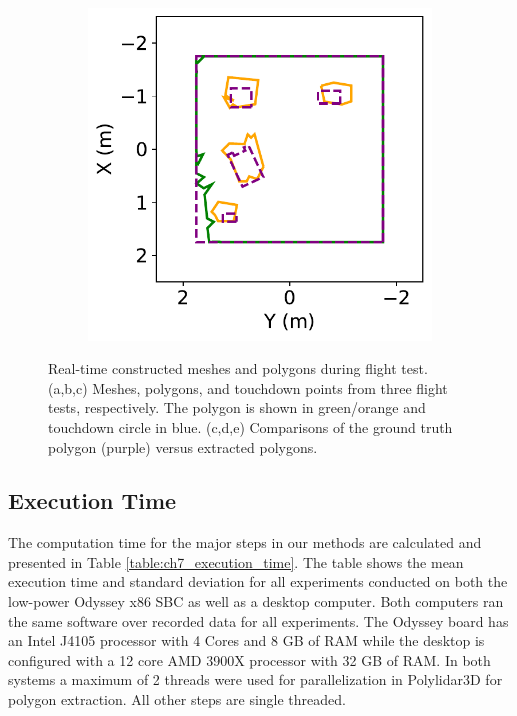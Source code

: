 \begin{figure}[!htb]
\begin{subfigure}[t]{.32\linewidth}
    \caption{\label{fig:ch7_flight_poly_b}}
  \end{subfigure}
  \begin{subfigure}[t]{.32\linewidth}
    \centering  \includegraphics[clip,trim=0cm 0cm 0cm 0cm,width=.99\linewidth]{chapter_7_experiments/imgs/flight_poly_3.pdf}
    \caption{\label{fig:ch7_flight_poly_c}}
  \end{subfigure}
  \caption[Real-time constructed meshes and polygons during flight test]{Real-time constructed meshes and polygons during flight test. (a,b,c) Meshes, polygons, and touchdown points from three flight tests, respectively. The polygon is shown in green/orange and touchdown circle in blue. (c,d,e) Comparisons of the ground truth polygon (purple) versus extracted polygons. }\label{fig:ch7_mesh_flight}
\end{figure}




\subsection{Execution Time} \label{sec:ch7_results_execution_time}

The computation time for the major steps in our methods are calculated and presented in Table \ref{table:ch7_execution_time}. The table shows the mean execution time and standard deviation for all experiments conducted on both the low-power Odyssey x86 \ac{SBC} as well as a desktop computer. Both computers ran the same software over recorded data for all experiments. The Odyssey board has an Intel J4105 processor with 4 Cores and 8 GB of RAM while the desktop is configured with a 12 core AMD 3900X processor with 32 GB of RAM. In both systems a maximum of 2 threads were used for parallelization in Polylidar3D for polygon extraction. All other steps are single threaded. 

